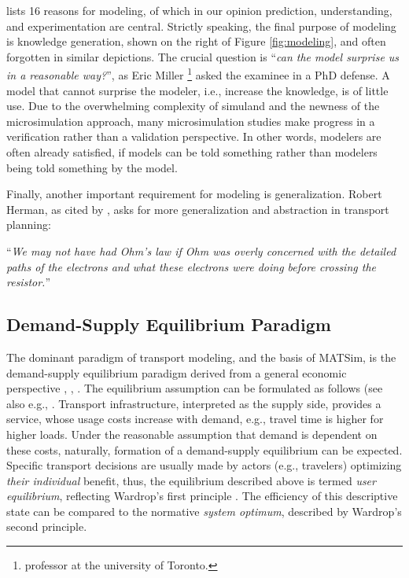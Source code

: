 %
\citet[][Section 1.9]{Epstein_Jass_2008} lists 16 reasons for modeling, of which in our opinion prediction, understanding, and experimentation are central. Strictly speaking, the final purpose of modeling is knowledge generation, shown on the right of Figure \ref{fig:modeling}, and often forgotten in similar depictions. The crucial question is ``\emph{can the model surprise us in a reasonable way?}'', as Eric Miller \footnote{professor at the university of Toronto.} asked the examinee in a PhD defense. A model that cannot surprise the modeler, i.e., increase the knowledge, is of little use. Due to the overwhelming complexity of simuland and the newness of the microsimulation approach, many microsimulation studies make progress in a verification rather than a validation perspective. In other words, modelers are often already satisfied, if models can be told something rather than modelers being told something by the model.

Finally, another important requirement for modeling is generalization. Robert Herman, as cited by \citet[][]{Mahmassani_Transportation_1988}, asks for more generalization and abstraction in transport planning: \begin{spacing}{1.0} ``\emph{We may not have had Ohm's law if Ohm was overly concerned with the detailed paths of the electrons and what these electrons were doing before crossing the resistor.}'' \end{spacing}


\subsection{Demand-Supply Equilibrium Paradigm}
\label{sec:equilibrium}
The dominant paradigm of transport modeling, and the basis of MATSim, is the demand-supply equilibrium paradigm derived from a general economic perspective  \citep[][p.38]{BoyceWilliams_ERSA_2003}, \citep[][]{Bates_HensherButton_2000, Patriksson_1994}, \citep[][p.7]{OrtuzarWillumsen_2001}. The equilibrium assumption can be formulated as follows (see also e.g., \citet[][p.7f]{OrtuzarWillumsen_2001}. Transport infrastructure, interpreted as the supply side, provides a service, whose usage costs increase with demand, e.g., travel time is higher for higher loads. Under the reasonable assumption that demand is dependent on these costs, naturally, formation of a demand-supply equilibrium can be expected. Specific transport decisions are usually made by actors (e.g., travelers) optimizing \emph{their individual} benefit, thus, the equilibrium described above is termed \emph{user equilibrium}, reflecting Wardrop's first principle \citep[][]{Wardrop_PICE_1952, CorreaStier_Cochran_2010}. The efficiency of this descriptive state can be compared to the normative \emph{system optimum}, described by Wardrop's second principle. 

